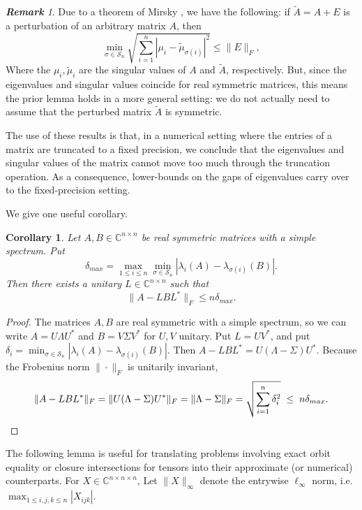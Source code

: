 \documentclass[11pt]{article}
\numberwithin{equation}{section}
\newtheorem{corollary}{Corollary}[section]
\theoremstyle{remark}
\newtheorem{remark}{\bf Remark}[section]
\newcommand{\CC}{\mathbb{C}}
\newcommand{\cS}{\mathcal{S}}
\begin{document}
\begin{remark}
    Due to a theorem of Mirsky \cite{mirsky1960symmetric}, we have the following: if $\tilde{A} = A + E$ is a perturbation of an arbitrary matrix $A$, then
    \[
    \min_{\sigma \in \cS_n}\sqrt{\sum_{i=1}^n |\mu_i-\tilde{\mu}_{\sigma(i)}|^2} \leq \|E\|_F,
    \]
    Where the $\mu_i, \tilde{\mu}_i$ are the singular values of $A$ and $\tilde{A}$, respectively.
    But, since the eigenvalues and singular values coincide for real symmetric matrices, this means the prior lemma holds in a more general setting: we do not actually need to assume that the perturbed matrix $\tilde{A}$ is symmetric.
\end{remark}

The use of these results is that, in a numerical setting where the entries of a matrix are truncated to a fixed precision, we conclude that the eigenvalues and singular values of the matrix cannot move too much through the truncation operation. As a consequence, lower-bounds on the gaps of eigenvalues carry over to the fixed-precision setting.

We give one useful corollary.

\begin{corollary}
    Let $A, B \in \CC^{n\times n}$ be real symmetric matrices with a simple spectrum.
    Put 
    \[
    \delta_{max} = \max_{1\leq i \leq n} \min_{\sigma \in \cS_n} |\lambda_i(A)-\lambda_{\sigma(i)}(B)|.
    \]
    Then there exists a unitary $L \in \CC^{n\times n}$ such that
    \[
    \|A-LBL^*\|_F \leq n \delta_{max}.
    \]
\end{corollary}
\begin{proof}
    The matrices $A, B$ are real symmetric with a simple spectrum, so we can write $A = U \Lambda U^*$ and $B = V \Sigma V^*$ for $U, V$ unitary. Put $L = UV^*$, and put $\delta_i = \min_{\sigma \in \cS_n} |\lambda_i(A)-\lambda_{\sigma(i)}(B)|$.
    Then $A-LBL^* = U(\Lambda-\Sigma)U^*$. Because the Frobenius norm $\|\cdot\|_F$ is unitarily invariant,
    \[
    \|A-LBL^*\|_F = \|U(\Lambda-\Sigma)U^*\|_F = \|\Lambda-\Sigma\|_F=  \sqrt{\sum_{i=1}^n\delta_i^2} \; \leq \; n \delta_{max}.\qedhere
    \]
\end{proof}

The following lemma is useful for translating problems involving exact orbit equality or closure intersections for tensors into their approximate (or numerical) counterparts.
For $X \in \CC^{n\times n\times n}$, Let $\|X \|_\infty$ denote the entrywise $\ell_\infty$ norm, i.e. $\max_{1\leq i,j,k \leq n} |X_{ijk}|$.
\end{document}
